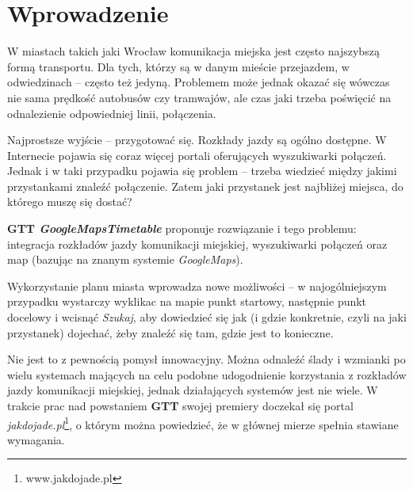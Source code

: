 \documentclass[a4paper,12pt]{article}
\begin{document}
\section*{Wprowadzenie} 


W miastach takich jaki Wrocław komunikacja miejska jest często najszybszą formą
transportu. Dla tych, którzy są w danym mieście przejazdem, w odwiedzinach --
często też jedyną. Problemem może jednak okazać się wówczas nie sama prędkość
autobusów czy tramwajów, ale czas jaki trzeba poświęcić na odnalezienie odpowiedniej linii, połączenia.

Najprostsze wyjście -- przygotować się. Rozkłady
jazdy są ogólno dostępne. W Internecie pojawia się coraz więcej portali
oferujących wyszukiwarki połączeń. Jednak i w taki przypadku pojawia się
problem -- trzeba wiedzieć między jakimi przystankami znaleźć połączenie. Zatem
jaki przystanek jest najbliżej miejsca, do którego muszę się dostać?

\textbf{GTT \emph{GoogleMapsTimetable}} proponuje rozwiązanie i tego problemu:
integracja rozkładów jazdy komunikacji miejskiej, wyszukiwarki połączeń oraz
map (bazując na znanym systemie \emph{GoogleMaps}).

Wykorzystanie planu miasta wprowadza nowe możliwości -- w najogólniejszym
przypadku wystarczy wyklikac na mapie punkt startowy, następnie punkt docelowy
i wcisnąć \emph{Szukaj}, aby dowiedzieć się jak (i gdzie konkretnie, czyli na
jaki przystanek) dojechać, żeby znaleźć się tam, gdzie jest to konieczne.

Nie jest to z pewnością pomysł innowacyjny. Można odnaleźć ślady i wzmianki
po wielu systemach mających na celu podobne udogodnienie korzystania z
rozkładów jazdy komunikacji miejskiej, jednak działających systemów jest nie
wiele. W trakcie prac nad powstaniem \textbf{GTT} swojej premiery doczekał się
portal \emph{jakdojade.pl}\footnote{www.jakdojade.pl}, o którym można
powiedzieć, że w głównej mierze spełnia stawiane wymagania.
\end{document}
